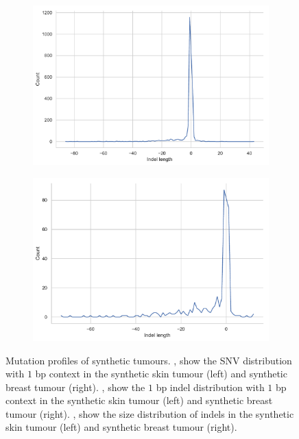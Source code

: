 \documentclass{article}
\begin{document}
\begin{figure}[ht!]
\begin{subfigure}[b]{0.49\textwidth}
        \includegraphics[width=\textwidth]{figures/synthetic_skin_spike_indels}
        \caption{}
        \label{supfig:synthetic-skin-indel-size}
    \end{subfigure}
    \begin{subfigure}[b]{0.49\textwidth}
        \includegraphics[width=\textwidth]{figures/synthetic_breast_spike_indels}
        \caption{}
        \label{supfig:synthetic-breast-indel-size}
    \end{subfigure}
    \caption{Mutation profiles of synthetic tumours. \textbf{}, \textbf{} show the SNV distribution with $1$ bp context in the synthetic skin tumour (left) and synthetic breast tumour (right). \textbf{}, \textbf{} show the $1$ bp indel distribution with $1$ bp context in the synthetic skin tumour (left) and synthetic breast tumour (right). \textbf{}, \textbf{} show the size distribution of indels in the synthetic skin tumour (left) and synthetic breast tumour (right).} 
    \label{supfig:synthetic-tumours}
\end{figure}
\end{document}

